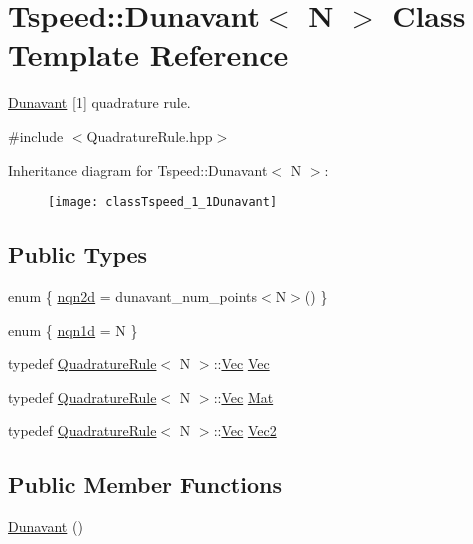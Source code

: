\hypertarget{classTspeed_1_1Dunavant}{\section{Tspeed\-:\-:Dunavant$<$ N $>$ Class Template Reference}
\label{classTspeed_1_1Dunavant}
}


\hyperlink{classTspeed_1_1Dunavant}{Dunavant} \mbox{[}1\mbox{]} quadrature rule.  




{\ttfamily \#include $<$Quadrature\-Rule.\-hpp$>$}

Inheritance diagram for Tspeed\-:\-:Dunavant$<$ N $>$\-:\begin{figure}[H]
\begin{center}
\leavevmode
\texttt{[image: classTspeed\_1\_1Dunavant]}
\end{center}
\end{figure}
\subsection*{Public Types}
\begin{DoxyCompactItemize}
\item 
enum \{ \hyperlink{classTspeed_1_1Dunavant_a5490f3fa01eb0b3072ee657afc64053fa9142a1285dd27e2e329bf53154974324}{nqn2d} = dunavant\-\_\-num\-\_\-points$<$N$>$()
 \}
\item 
enum \{ \hyperlink{classTspeed_1_1Dunavant_a69286a2b90f14407f1133581a2667919a3ba00ee4f1fc556134ca24ff435e53eb}{nqn1d} = N
 \}
\item 
typedef \hyperlink{classTspeed_1_1QuadratureRule}{Quadrature\-Rule}$<$ N $>$\-::\hyperlink{classTspeed_1_1QuadratureRule_a195c2b71ad957c9dc5408452b11e1302}{Vec} \hyperlink{classTspeed_1_1Dunavant_a8562daa3d038126144415fa4ba851e81}{Vec}
\item 
typedef \hyperlink{classTspeed_1_1QuadratureRule}{Quadrature\-Rule}$<$ N $>$\-::\hyperlink{classTspeed_1_1QuadratureRule_a195c2b71ad957c9dc5408452b11e1302}{Vec} \hyperlink{classTspeed_1_1Dunavant_a87e65aed6cfa6ace8ea6374f3b005d78}{Mat}
\item 
typedef \hyperlink{classTspeed_1_1QuadratureRule}{Quadrature\-Rule}$<$ N $>$\-::\hyperlink{classTspeed_1_1QuadratureRule_a195c2b71ad957c9dc5408452b11e1302}{Vec} \hyperlink{classTspeed_1_1Dunavant_acc838f609850fd31cbbeb87578b1a8c5}{Vec2}
\end{DoxyCompactItemize}
\subsection*{Public Member Functions}
\begin{DoxyCompactItemize}
\item 
\hyperlink{classTspeed_1_1Dunavant_ac20f5d5f0ed9496a7b37a7ee082f635d}{Dunavant} ()
\end{DoxyCompactItemize}
